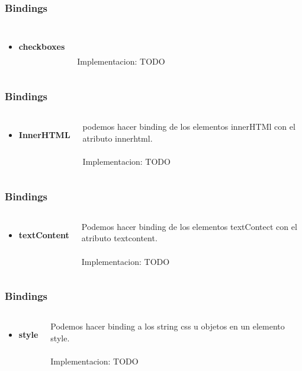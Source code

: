 \documentclass{beamer}
\begin{document}
\begin{frame}
\frametitle{Bindings}
\begin{columns}[c]

\begin{itemize}
\item \textbf{checkboxes}
\end{itemize}

\\~\\
Implementacion: TODO
\end{columns}
\end{frame}
\begin{frame}
\frametitle{Bindings}
\begin{columns}[c]

\begin{itemize}
\item \textbf{InnerHTML}
\end{itemize}

podemos hacer binding de los elementos innerHTMl con el atributo innerhtml.
\\~\\
Implementacion: TODO
\end{columns}
\end{frame}
\begin{frame}
\frametitle{Bindings}
\begin{columns}[c]
\begin{itemize}
\item \textbf{textContent}
\end{itemize}
Podemos hacer binding de los elementos textContect con el atributo textcontent.
\\~\\
Implementacion: TODO
\end{columns}
\end{frame}
\begin{frame}
\frametitle{Bindings}
\begin{columns}[c]
\begin{itemize}
\item \textbf{style}
\end{itemize}
Podemos hacer binding a los string css u objetos en un elemento style.
\\~\\
Implementacion: TODO
\end{columns}
\end{frame}
\end{document}
